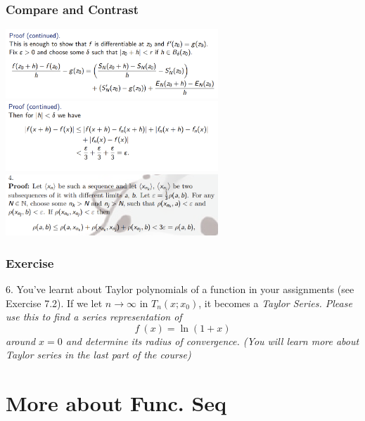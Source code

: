 \documentclass{beamer}
\newcommand{\myfont}{\rmfamily\normalsize\upshape\mdseries}
\begin{document}
\begin{frame}
    \frametitle{Compare and Contrast}
    \centering
    \includegraphics[width=0.6\textwidth]{split3_1.png}
    \includegraphics[width=0.6\textwidth]{split3_3.png}
    \includegraphics[width=0.6\textwidth]{split3_2.png}
\end{frame}
\begin{frame}
    \frametitle{Exercise}
    6. You’ve learnt about Taylor polynomials of a function in your assignments
(see Exercise 7.2). If we let $n \to \infty $ in $ T_n(x; x_0)$, it becomes a \itshape Taylor
Series\myfont. Please use this to find a series representation of
$$f~(x) = \ln (1 + x)$$
around $x = 0$ and determine its radius of convergence.
(You will learn more about Taylor series in the last part of the course)

\end{frame}

\section{More about Func. Seq}
\end{document}
